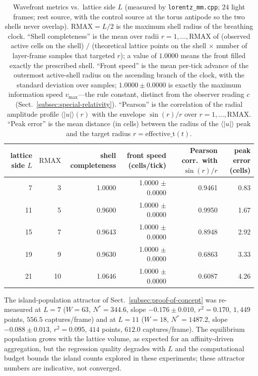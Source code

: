 \documentclass{ijuc}
\begin{document}
\begin{table}[h]
\centering
\caption{Wavefront metrics vs.\ lattice side $L$ (measured by \texttt{lorentz\_mm.cpp}; $24$ light frames; rest source, with the control source at the torus antipode so the two shells never overlap).  $\mathrm{RMAX}=L/2$ is the maximum shell radius of the breathing clock.  ``Shell completeness'' is the mean over radii $r=1,\dots,\mathrm{RMAX}$ of (observed active cells on the shell) $/$ (theoretical lattice points on the shell $\times$ number of layer-frame samples that targeted $r$); a value of $1.0000$ means the front filled exactly the prescribed shell.  ``Front speed'' is the mean per-tick advance of the outermost active-shell radius on the ascending branch of the clock, with the standard deviation over samples; $1.0000\pm0.0000$ is exactly the maximum information speed $v_{\max}$---the rule constant, distinct from the observer reading $c$ (Sect.~\ref{subsec:special-relativity}).  ``Pearson'' is the correlation of the radial amplitude profile $\langle|u|\rangle(r)$ with the envelope $\sin(r)/r$ over $r=1,\dots,\mathrm{RMAX}$.  ``Peak error'' is the mean distance (in cells) between the radius of the $\langle|u|\rangle$ peak and the target radius $r=\mathrm{effective\_t}(t)$.}
\label{tab:scaling}
\begin{tabular}{|r|r|r|r|r|r|}
\hline
lattice side $L$ & $\mathrm{RMAX}$ & shell completeness & front speed (cells/tick) & Pearson corr.\ with $\sin(r)/r$ & peak error (cells)\\
\hline
7 & 3 & 1.0000 & 1.0000 $\pm$ 0.0000 & 0.9461 & 0.83\\
11 & 5 & 0.9600 & 1.0000 $\pm$ 0.0000 & 0.9950 & 1.67\\
15 & 7 & 0.9643 & 1.0000 $\pm$ 0.0000 & 0.8948 & 2.92\\
19 & 9 & 0.9630 & 1.0000 $\pm$ 0.0000 & 0.6863 & 3.33\\
21 & 10 & 1.0646 & 1.0000 $\pm$ 0.0000 & 0.6087 & 4.26\\
\hline
\end{tabular}
\end{table}
The island-population attractor of Sect.~\ref{subsec:proof-of-concept} was re-measured at $L=7$ ($W=63$, $N^{*}=344.6$, slope $-0.176\pm0.010$, $r^{2}=0.170$, $1{,}449$ points, $556.5$ captures/frame) and at $L=11$ ($W=18$, $N^{*}=1487.2$, slope $-0.088\pm0.013$, $r^{2}=0.095$, $414$ points, $612.0$ captures/frame).  The equilibrium population grows with the lattice volume, as expected for an affinity-driven aggregation, but the regression quality degrades with $L$ and the computational budget bounds the island counts explored in these experiments; these attractor numbers are indicative, not converged.
\end{document}
